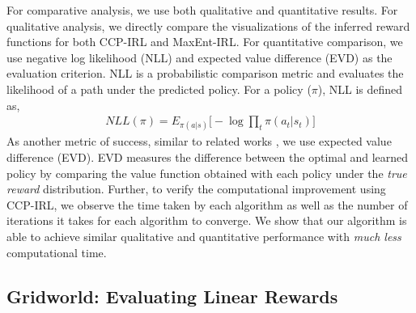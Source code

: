 \documentclass{article}
\begin{document}
For comparative analysis, we use both qualitative and quantitative results.
For qualitative analysis, we directly compare the visualizations of the inferred reward functions for both CCP-IRL and MaxEnt-IRL.
For quantitative comparison, we use negative log likelihood (NLL) \cite{kitani2012activity} and expected value difference (EVD) \cite{levine2011nonlinear} as the evaluation criterion. NLL is a probabilistic comparison metric and evaluates the likelihood of a path under the predicted policy. For a policy ($\pi$), NLL is defined as,
\begin{align}
NLL(\pi) = E_{\pi(a|s)}\big[-\log \prod_{t} \pi(a_{t}|s_{t}) \big]
\end{align}
As another metric of success, similar to related works \cite{Levine2013, wulfmeier2015maximum}, we use expected value difference (EVD). EVD measures the difference between the optimal and learned policy by comparing the value function obtained with each policy under the \textit{true reward} distribution.
Further, to verify the computational improvement using CCP-IRL, we observe the time taken by each algorithm as well as the number of iterations it takes for each algorithm to converge. We show that our algorithm is able to achieve similar qualitative and quantitative performance with \textit{much less} computational time.


\subsection{Gridworld: Evaluating Linear Rewards} 
\end{document}
